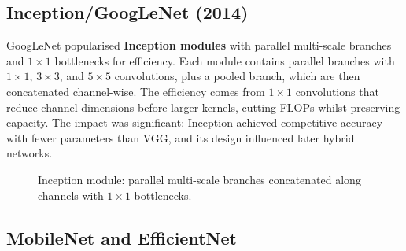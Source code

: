 \subsection{Inception/GoogLeNet (2014)}
\label{subsec:inception}

GoogLeNet popularised \textbf{Inception modules} with parallel multi-scale branches and $1\times1$ bottlenecks for efficiency. Each module contains parallel branches with $1\times1$, $3\times3$, and $5\times5$ convolutions, plus a pooled branch, which are then concatenated channel-wise. The efficiency comes from $1\times1$ convolutions that reduce channel dimensions before larger kernels, cutting FLOPs whilst preserving capacity. The impact was significant: Inception achieved competitive accuracy with fewer parameters than VGG, and its design influenced later hybrid networks.

\begin{figure}[h]
    \centering
    \caption{Inception module: parallel multi-scale branches concatenated along channels with $1\times1$ bottlenecks.}
    \label{fig:inception-module}
\end{figure}

\subsection{MobileNet and EfficientNet}

